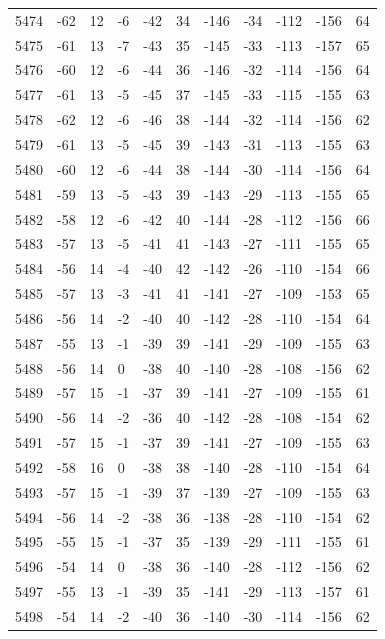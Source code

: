 \begin{table}[H]
\begin{tabular}{lllllllllll}
5474 & -62 & 12 & -6 & -42 & 34 & -146 & -34 & -112 & -156 & 64 \\
5475 & -61 & 13 & -7 & -43 & 35 & -145 & -33 & -113 & -157 & 65 \\
5476 & -60 & 12 & -6 & -44 & 36 & -146 & -32 & -114 & -156 & 64 \\
5477 & -61 & 13 & -5 & -45 & 37 & -145 & -33 & -115 & -155 & 63 \\
5478 & -62 & 12 & -6 & -46 & 38 & -144 & -32 & -114 & -156 & 62 \\
5479 & -61 & 13 & -5 & -45 & 39 & -143 & -31 & -113 & -155 & 63 \\
5480 & -60 & 12 & -6 & -44 & 38 & -144 & -30 & -114 & -156 & 64 \\
5481 & -59 & 13 & -5 & -43 & 39 & -143 & -29 & -113 & -155 & 65 \\
5482 & -58 & 12 & -6 & -42 & 40 & -144 & -28 & -112 & -156 & 66 \\
5483 & -57 & 13 & -5 & -41 & 41 & -143 & -27 & -111 & -155 & 65 \\
5484 & -56 & 14 & -4 & -40 & 42 & -142 & -26 & -110 & -154 & 66 \\
5485 & -57 & 13 & -3 & -41 & 41 & -141 & -27 & -109 & -153 & 65 \\
5486 & -56 & 14 & -2 & -40 & 40 & -142 & -28 & -110 & -154 & 64 \\
5487 & -55 & 13 & -1 & -39 & 39 & -141 & -29 & -109 & -155 & 63 \\
5488 & -56 & 14 & 0 & -38 & 40 & -140 & -28 & -108 & -156 & 62 \\
5489 & -57 & 15 & -1 & -37 & 39 & -141 & -27 & -109 & -155 & 61 \\
5490 & -56 & 14 & -2 & -36 & 40 & -142 & -28 & -108 & -154 & 62 \\
5491 & -57 & 15 & -1 & -37 & 39 & -141 & -27 & -109 & -155 & 63 \\
5492 & -58 & 16 & 0 & -38 & 38 & -140 & -28 & -110 & -154 & 64 \\
5493 & -57 & 15 & -1 & -39 & 37 & -139 & -27 & -109 & -155 & 63 \\
5494 & -56 & 14 & -2 & -38 & 36 & -138 & -28 & -110 & -154 & 62 \\
5495 & -55 & 15 & -1 & -37 & 35 & -139 & -29 & -111 & -155 & 61 \\
5496 & -54 & 14 & 0 & -38 & 36 & -140 & -28 & -112 & -156 & 62 \\
5497 & -55 & 13 & -1 & -39 & 35 & -141 & -29 & -113 & -157 & 61 \\
5498 & -54 & 14 & -2 & -40 & 36 & -140 & -30 & -114 & -156 & 62 \\

\end{tabular}
\end{table}
